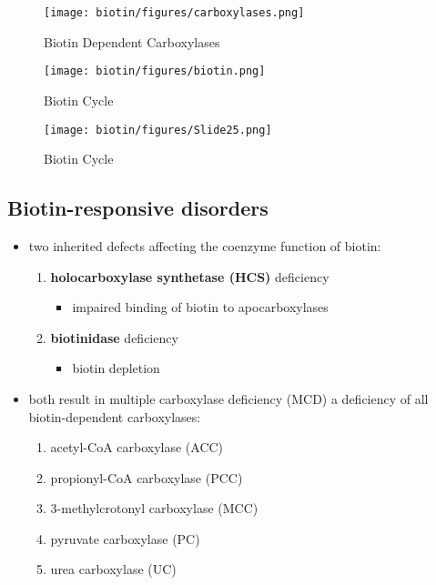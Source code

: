 \documentclass[12pt]{scrartcl}
\begin{document}
\begin{figure}[htbp]
\centering
\texttt{[image: biotin/figures/carboxylases.png]}
\caption{\label{fig:orgadc7300}Biotin Dependent Carboxylases}
\end{figure}

\begin{figure}[htbp]
\centering
\texttt{[image: biotin/figures/biotin.png]}
\caption{\label{fig:orgceeb57b}Biotin Cycle}
\end{figure}

\begin{figure}[htbp]
\centering
\texttt{[image: biotin/figures/Slide25.png]}
\caption{\label{fig:org25a2218}Biotin Cycle}
\end{figure}

\subsection{Biotin-responsive disorders}
\label{sec:orgd86b334}
\begin{itemize}
\item two inherited defects affecting the coenzyme function of biotin:
\begin{enumerate}
\item \textbf{holocarboxylase synthetase (HCS)} deficiency
\begin{itemize}
\item impaired binding of biotin to apocarboxylases
\end{itemize}
\item \textbf{biotinidase} deficiency
\begin{itemize}
\item biotin depletion
\end{itemize}
\end{enumerate}

\item both result in multiple carboxylase deficiency (MCD) a deficiency of
all biotin-dependent carboxylases:
\begin{enumerate}
\item acetyl-CoA carboxylase (ACC)
\item propionyl-CoA carboxylase (PCC)
\item 3-methylcrotonyl carboxylase (MCC)
\item pyruvate carboxylase (PC)
\item urea carboxylase (UC)
\end{enumerate}
\end{itemize}
\end{document}
